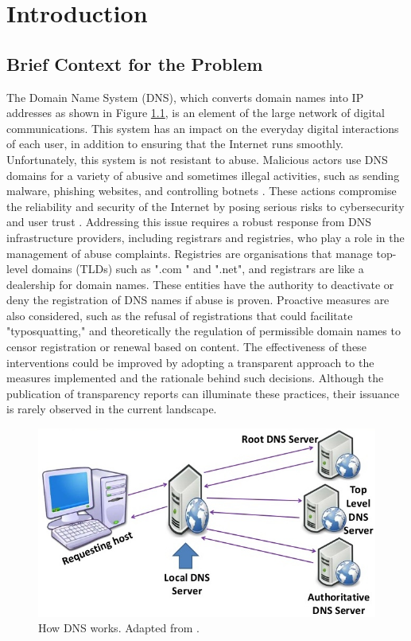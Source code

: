 \chapter{Introduction}


\section{Brief Context for the Problem}

The Domain Name System (DNS), which converts domain names into IP addresses as shown in Figure \ref{fig:dnsIntro}, is an element of the large network of digital communications. This system has an impact on the everyday digital interactions of each user, in addition to ensuring that the Internet runs smoothly. Unfortunately, this system is not resistant to abuse. Malicious actors use DNS domains for a variety of abusive and sometimes illegal activities, such as sending malware, phishing websites, and controlling botnets \cite{so2022}. These actions compromise the reliability and security of the Internet by posing serious risks to cybersecurity and user trust \cite{bayer2022}. Addressing this issue requires a robust response from DNS infrastructure providers, including registrars and registries, who play a role in the management of abuse complaints. Registries are organisations that manage top-level domains (TLDs) such as ".com " and ".net", and registrars are like a dealership for domain names. These entities have the authority to deactivate or deny the registration of DNS names if abuse is proven. Proactive measures are also considered, such as the refusal of registrations that could facilitate "typosquatting," and theoretically the regulation of permissible domain names to censor registration or renewal based on content. The effectiveness of these interventions could be improved by adopting a transparent approach to the measures implemented and the rationale behind such decisions. Although the publication of transparency reports can illuminate these practices, their issuance is rarely observed in the current landscape.

\begin{figure}[H]
    \centering
    \includegraphics[width=0.5\linewidth]{introduction/dnsWork.jpg}
    \caption{How DNS works. Adapted from \cite{blanche2018understandingDNS}. }
    \label{fig:dnsIntro}
\end{figure}

